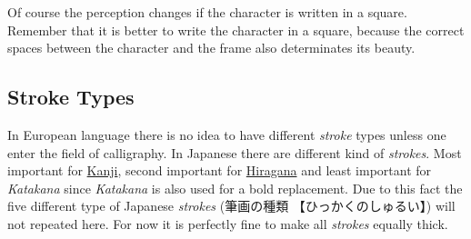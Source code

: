 
\bigskip

Of course the perception changes if the character is written in a square.
Remember that it is better to write the character in a square, because the
correct spaces between the character and the frame also determinates its
beauty.

\bigskip


\bigskip

\subsection{Stroke Types}
\label{sec:StrokeTypes}
\label{sec:Stroke}
\label{subsec:StrokeTypes}

In European language there is no idea to have different \textit{stroke} types
unless one enter the field of calligraphy. In Japanese there are different kind
of \textit{strokes}.  Most important for \hyperref[sec:Kanji]{Kanji}, second
important for \hyperref[sec:Hiragana]{Hiragana} and least important for
\textit{Katakana} since \textit{Katakana} is also used for a bold replacement.
Due to this fact the five different type of Japanese \textit{strokes}
({筆画の種類} {【ひっかくのしゅるい】}) will not repeated here. For now it is
perfectly fine to make all \textit{strokes} equally thick. 


